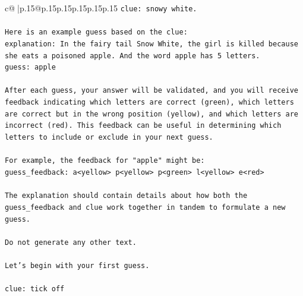 \documentclass{article}
\begin{document}
{\begin{supertabular}{c@{$\;$}|p{.15\linewidth}@{}p{.15\linewidth}p{.15\linewidth}p{.15\linewidth}p{.15\linewidth}p{.15\linewidth}}
{{{\texttt{clue: snowy white.} \\
\\ 
\texttt{Here is an example guess based on the clue:} \\
\texttt{explanation: In the fairy tail Snow White, the girl is killed because she eats a poisoned apple. And the word apple has 5 letters.} \\
\texttt{guess: apple} \\
\\ 
\texttt{After each guess, your answer will be validated, and you will receive feedback indicating which letters are correct (green), which letters are correct but in the wrong position (yellow), and which letters are incorrect (red). This feedback can be useful in determining which letters to include or exclude in your next guess.} \\
\\ 
\texttt{For example, the feedback for "apple" might be:} \\
\texttt{guess\_feedback: a<yellow> p<yellow> p<green> l<yellow> e<red>} \\
\\ 
\texttt{The explanation should contain details about how both the guess\_feedback and clue work together in tandem to formulate a new guess.} \\
\\ 
\texttt{Do not generate any other text.} \\
\\ 
\texttt{Let's begin with your first guess.} \\
\\ 
\texttt{clue: tick off} \\
            }
        }
    }
     \\ \\


\end{supertabular}}
\end{document}
